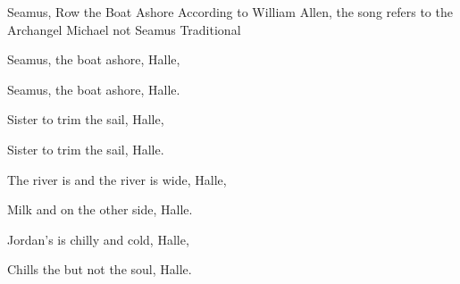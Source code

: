 \begin{SBSong}{Seamus, Row the Boat Ashore}
  {According to William Allen, the song refers to the Archangel Michael not Seamus}
  {Traditional}
  \begin{SBChorus}
    Seamus,  the boat ashore, Halle,
    
    Seamus,  the boat ashore, Halle. 
  \end{SBChorus}
  \begin{SBVerse}
    Sister  to trim the sail, Halle,
    
    Sister  to trim the sail, Halle. 
  \end{SBVerse}
  \begin{SBVerse}
    The river is  and the river is wide, Halle,
    
    Milk and  on the other side, Halle. 
  \end{SBVerse}
  \begin{SBVerse}
    Jordan's  is chilly and cold, Halle,
    
    Chills the  but not the soul, Halle. 
  \end{SBVerse}
\end{SBSong}